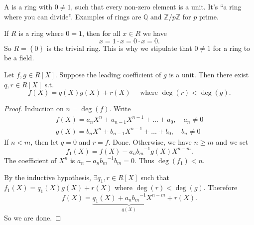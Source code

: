 \documentclass[a4paper]{scrartcl}
\begin{document}
\begin{definition*}[Field]
       A  is a ring with $0 \neq 1$, such that every non-zero element is a unit. It's ``a ring where you can divide''. Examples of rings are $\mathbb{Q} $ and $\mathbb{Z}/p\mathbb{Z}$ for $p$ prime.
\end{definition*}
\begin{remark}
       If $R$ is a ring where $0=1$, then for all $x \in R$ we have \[
       x=1 \cdot x =0 \cdot x=0
       .\] So $R=\left\{0\right\}$ is the trivial ring. This is why we stipulate that $0 \neq 1$ for a ring to be a field.
\end{remark}
\begin{proposition}\label{euclidrings}
       Let $f,g \in R[X]$. Suppose the leading coefficient of $g$ is a unit. Then there exist $q, r \in R[X]$ s.t. \[
       f (X)=q (X)g (X)+r (X) \quad \text{ where } \operatorname{deg}(r) < \operatorname{deg}(g)
       .\] 
\end{proposition}
\begin{proof}
       Induction on $n=\operatorname{deg}(f)$. Write \begin{align*}
             f (X)= a_{n}X^{n}+a_{n-1}X^{n-1}+ \ldots +a_0 , \quad a_{n}\neq 0\\
             g (X)= b_{n}X^{n}+b_{n-1}X^{n-1}+ \ldots +b_0 , \quad b_{n}\neq 0
       \end{align*}
       If $n<m$, then let $q=0$ and $r=f$. Done. Otherwise, we have $n \geq m$ and we set \[
       f_1 (X)= f (X)-a_{n} {b_{m}}^{-1} g (X) X ^{n-m}
       .\] The coefficient of $X^{n}$ is $a_{n}-a_{n}{b_{m}}^{-1}b_{m}=0$. Thus  $\operatorname{deg}(f_{1})<n$. 
       
       By the inductive hypothesis, $\exists q_1 ,r \in R[X]$ such that $f_1 (X)=q_1 (X)g (X)+r (X)$ where $\operatorname{deg}(r) < \operatorname{deg}(g)$. Therefore \[
       f (X)=\underbrace{q_1 (X)+a_n {b_{m}}^{-1} X ^{n-m}}_{q (X)}+r (X) 
       .\] So we are done. 
\end{proof}
\end{document}
